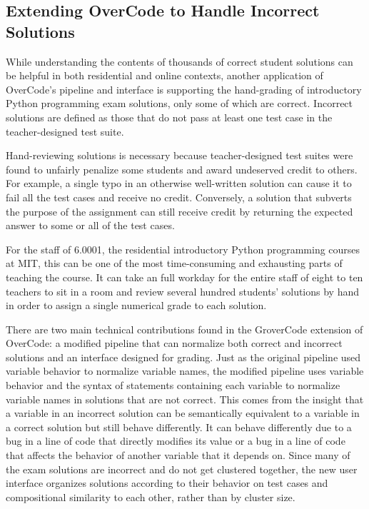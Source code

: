 \subsection{Extending OverCode to Handle Incorrect Solutions}\label{sec:grover}

While understanding the contents of thousands of correct student solutions can be helpful in both residential and online contexts, another application of OverCode's pipeline and interface is supporting the hand-grading of introductory Python programming exam solutions, only some of which are correct. Incorrect solutions are defined as those that do not pass at least one test case in the teacher-designed test suite.

Hand-reviewing solutions is necessary because teacher-designed test suites were found to unfairly penalize some students and award undeserved credit to others. For example, a single typo in an otherwise well-written solution can cause it to fail all the test cases and receive no credit. Conversely, a solution that subverts the purpose of the assignment can still receive credit by returning the expected answer to some or all of the test cases.

For the staff of 6.0001, the residential introductory Python programming courses at MIT, this can be one of the most time-consuming and exhausting parts of teaching the course. It can take an full workday for the entire staff of eight to ten teachers to sit in a room and review several hundred students' solutions by hand in order to assign a single numerical grade to each solution. 

There are two main technical contributions found in the GroverCode extension of OverCode: a modified pipeline that can normalize both correct and incorrect solutions and an interface designed for grading. Just as the original pipeline used variable behavior to normalize variable names, the modified pipeline uses variable behavior and the syntax of statements containing each variable to normalize variable names in solutions that are not correct. This comes from the insight that a variable in an incorrect solution can be semantically equivalent to a variable in a correct solution but still behave differently. It can behave differently due to a bug in a line of code that directly modifies its value or a bug in a line of code that affects the behavior of another variable that it depends on. Since many of the exam solutions are incorrect and do not get clustered together, the new user interface organizes solutions according to their behavior on test cases and compositional similarity to each other, rather than by cluster size.

